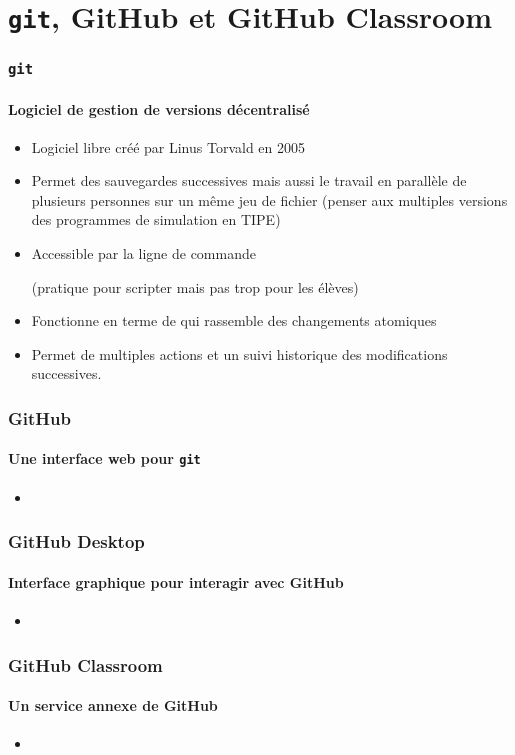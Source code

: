 \section{\texttt{git}, GitHub et GitHub Classroom}

\begin{frame}
\frametitle{\texttt{git}}
\framesubtitle{Logiciel de gestion de versions décentralisé}

\begin{itemize}[<+->]
	\item	 Logiciel libre créé par Linus Torvald en 2005
	\item  Permet des sauvegardes successives mais aussi le travail en parallèle de plusieurs personnes sur un même jeu de fichier (penser aux multiples versions des programmes de simulation en TIPE)
	\item  Accessible par la ligne de commande

	(pratique pour scripter mais pas trop pour les élèves)
	\item  Fonctionne en terme de  qui rassemble des changements atomiques
	\item 	Permet de multiples actions et un suivi historique des modifications successives.

\end{itemize}

\end{frame}


\begin{frame}
\frametitle{GitHub}
\framesubtitle{Une interface web pour \texttt{git}}

\begin{itemize}[<+->]
	\item

\end{itemize}

\end{frame}

\begin{frame}
\frametitle{GitHub Desktop}
\framesubtitle{Interface graphique pour interagir avec GitHub}

\begin{itemize}[<+->]
	\item

\end{itemize}

\end{frame}

\begin{frame}
\frametitle{GitHub Classroom}
\framesubtitle{Un service annexe de GitHub}

\begin{itemize}[<+->]
	\item	

\end{itemize}

\end{frame}
